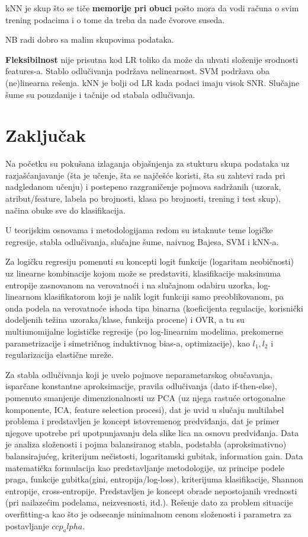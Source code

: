 \documentclass[fontsize=12bp, paper=a4]{scrarticle}
\begin{document}
kNN je skup što se tiče \textbf{memorije pri obuci} pošto mora da vodi računa o svim trening podacima i o tome da treba da nađe čvorove suseda.

NB radi dobro sa malim skupovima podataka.

\textbf{Fleksibilnost} nije prisutna kod LR toliko da može da uhvati složenije srodnosti features-a. Stablo odlučivanja podržava nelinearnost. SVM podržava oba (ne)linearna rešenja.
kNN je bolji od LR kada podaci imaju visok SNR.
Slučajne šume su pouzdanije i tačnije od stabala odlučivanja.

\newpage

\section{Zaključak}

Na početku su pokušana izlaganja objašnjenja za stukturu skupa podataka uz razjašćanjavanje (šta je učenje, šta se najčešće koristi, šta su zahtevi rada pri nadgledanom učenju) i postepeno razgraničenje pojmova sadržanih (uzorak, atribut/feature, labela po brojnosti, klasa po brojnosti, trening i test skup), načina obuke sve do klasifikacija.

\vbox{}

U teorijskim osnovama i metodologijama redom su istaknute teme logičke regresije, stabla odlučivanja, slučajne šume, naivnog Bajesa, SVM i kNN-a. 

\vbox{}


Za logičku regresiju pomenuti su koncepti logit funkcije (logaritam neobičnosti) uz linearne kombinacije kojom može se predstaviti, klasifikacije maksimuma entropije zasnovanom na verovatnoći i na slučajnom odabiru uzorka, log-linearnom klasifikatorom koji je nalik logit funkciji samo preoblikovanom, pa onda podela na verovatnoće ishoda tipa binarna (koeficijenta regulacije, korisnički dodeljenih težina uzoraka/klase, funkcija procene) i OVR, a tu su multiunomijalne logističke regresije (po log-linearnim modelima, prekomerne parametrizacije i simetričnog induktivnog bias-a, optimizacije), kao $l_1, l_2$ i regularizacija elastične mreže. 

\vbox{}


Za stabla odlučivanja koji je uvelo pojmove neparametarskog obučavanja, isparčane konstantne aproksimacije, pravila odlučivanja (dato if-then-else), pomenuto smanjenje dimenzionalnosti uz PCA (uz njega rastuće ortogonalne komponente, ICA, feature selection procesi), dat je uvid u slučaju multilabel problema i predstavljen je koncept istovremenog predviđanja, dat je primer njegove upotrebe pri upotpunjavanju dela slike lica na osnovu predviđanja. Data je analiza složenosti i pojma balansiranog stabla, podstabla (aproksimativno) balansirajućeg, kriterijum nečistosti, logaritamski gubitak, information gain.  Data matematička formulacija kao predstavljanje metodologije, uz principe podele praga, funkcije gubitka(gini, entropija/log-loss), kriterijuma klasifikacije, Shannon entropije, cross-entropije. Predstavljen je koncept obrade nepostojanih vrednosti (pri nailazećim podelama, neizvesnosti, itd.). Rešenje dato za problem situacije overfitting-a kao što je odsecanje minimalnom cenom složenosti i parametra za postavljanje $ccp_alpha$.
\end{document}
